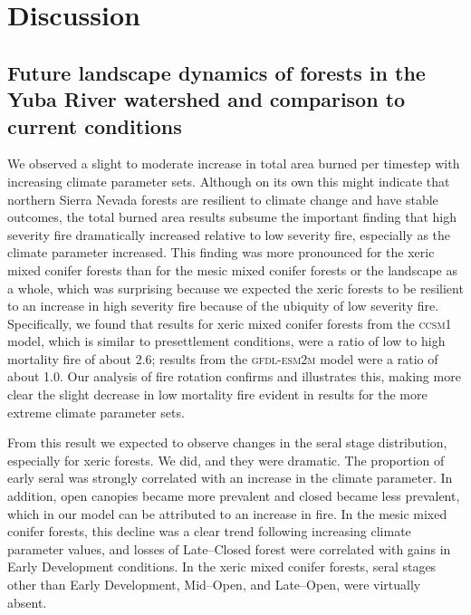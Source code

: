 \section{Discussion}

\subsection{Future landscape dynamics of forests in the Yuba River watershed and comparison to current conditions}
We observed a slight to moderate increase in total area burned per timestep with increasing climate parameter sets. Although on its own this might indicate that northern Sierra Nevada forests are resilient to climate change and have stable outcomes, the total burned area results subsume the important finding that high severity fire dramatically increased relative to low severity fire, especially as the climate parameter increased. This finding was more pronounced for the xeric mixed conifer forests than for the mesic mixed conifer forests or the landscape as a whole, which was surprising because we expected the xeric forests to be resilient to an increase in high severity fire because of the ubiquity of low severity fire. Specifically, we found that results for xeric mixed conifer forests from the \textsc{ccsm1} model, which is similar to presettlement conditions, were a ratio of low to high mortality fire of about 2.6; results from the \textsc{gfdl-esm2m} model were a ratio of about 1.0. Our analysis of fire rotation confirms and illustrates this, making more clear the slight decrease in low mortality fire evident in results for the more extreme climate parameter sets.

From this result we expected to observe changes in the seral stage distribution, especially for xeric forests. We did, and they were dramatic. The proportion of early seral was strongly correlated with an increase in the climate parameter. In addition, open canopies became more prevalent and closed became less prevalent, which in our model can be attributed to an increase in fire. In the mesic mixed conifer forests, this decline was a clear trend following increasing climate parameter values, and losses of Late--Closed forest were correlated with gains in Early Development conditions. In the xeric mixed conifer forests, seral stages other than Early Development, Mid--Open, and Late--Open, were virtually absent.

